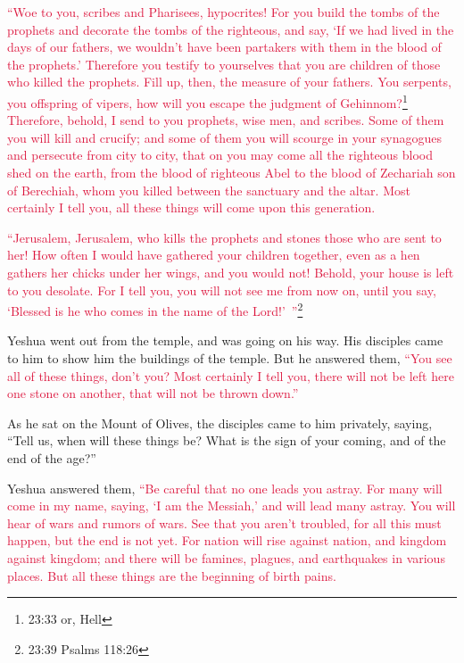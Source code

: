 \myverse{}\textcolor{crimson}{“Woe to you, scribes and Pharisees, hypocrites! For you
	build the tombs of the prophets and decorate the tombs of the righteous,
}
\myverse{}\textcolor{crimson}{and say, ‘If we had lived in the days of our fathers, we wouldn’t have
	been partakers with them in the blood of the prophets.’
}
\myverse{}\textcolor{crimson}{Therefore you testify to yourselves that you are children of those who
	killed the prophets.
}
\myverse{}\textcolor{crimson}{Fill up, then, the measure of your fathers.
}
\myverse{}\textcolor{crimson}{You serpents, you offspring of vipers, how will you escape the judgment
	of Gehinnom?}\footnote{23:33 or, Hell}
\myverse{}\textcolor{crimson}{Therefore, behold, I send to you prophets, wise men, and scribes. Some
	of them you will kill and crucify; and some of them you will scourge in your synagogues and persecute
	from city to city,
}
\myverse{}\textcolor{crimson}{that on you may come all the righteous blood shed on the earth, from
	the blood of righteous Abel to the blood of Zechariah son of Berechiah, whom you killed between the sanctuary
	and the altar.
}
\myverse{}\textcolor{crimson}{Most certainly I tell you, all these things will come upon this generation.}

\myverse{}\textcolor{crimson}{“Jerusalem, Jerusalem, who kills the prophets and stones
	those who are sent to her! How often I would have gathered your children together, even as a hen gathers
	her chicks under her wings, and you would not!
}
\myverse{}\textcolor{crimson}{Behold, your house is left to you desolate.
}
\myverse{}\textcolor{crimson}{For I tell you, you will not see me from now on, until you say, ‘Blessed
	is he who comes in the name of the Lord!’ ”}\footnote{23:39 Psalms 118:26
}


\mychapter{} \myverse*{}Yeshua went out from the temple, and was going on his way. His
disciples came to him to show him the buildings of the temple.
\myverse{}But he answered them,
\textcolor{crimson}{“You see all of these things, don’t you? Most certainly I tell you, there will not be left here one
	stone on another, that will not be thrown down.”}

\myverse{}As he sat on the Mount of Olives, the disciples came to him privately,
saying, “Tell us, when will these things be? What is the sign of your coming, and of the end of the age?”

\myverse{}Yeshua answered them,
\textcolor{crimson}{“Be careful that no one leads you astray.
}
\myverse{}\textcolor{crimson}{For many will come in my name, saying, ‘I am the Messiah,’ and will lead
	many astray.
}
\myverse{}\textcolor{crimson}{You will hear of wars and rumors of wars. See that you aren’t troubled,
	for all this must happen, but the end is not yet.
}
\myverse{}\textcolor{crimson}{For nation will rise against nation, and kingdom against kingdom; and there
	will be famines, plagues, and earthquakes in various places.
}
\myverse{}\textcolor{crimson}{But all these things are the beginning of birth pains.
}

